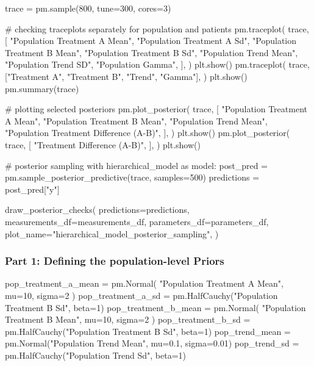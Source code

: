 \documentclass[12pt,a4paper,leqno]{report}
\theoremstyle{plain}
\theoremstyle{definition}
\theoremstyle{remark}
\begin{document}
\begin{pyverbatim}[][fontsize=\footnotesize]
    trace = pm.sample(800, tune=300, cores=3)

    # checking traceplots separately for population and patients
    pm.traceplot(
        trace,
        [
            "Population Treatment A Mean",
            "Population Treatment A Sd",
            "Population Treatment B Mean",
            "Population Treatment B Sd",
            "Population Trend Mean",
            "Population Trend SD",
            "Population Gamma",
        ],
    )
    plt.show()
    pm.traceplot(
        trace, ["Treatment A", "Treatment B", "Trend", "Gamma"],
    )
    plt.show()
    pm.summary(trace)

    # plotting selected posteriors
    pm.plot_posterior(
        trace,
        [
            "Population Treatment A Mean",
            "Population Treatment B Mean",
            "Population Trend Mean",
            "Population Treatment Difference (A-B)",
        ],
    )
    plt.show()
    pm.plot_posterior(
        trace,
        [
            "Treatment Difference (A-B)",
        ],
    )
    plt.show()

# posterior sampling
with hierarchical_model as model:
    post_pred = pm.sample_posterior_predictive(trace, samples=500)
    predictions = post_pred["y"]

draw_posterior_checks(
    predictions=predictions,
    measurements_df=measurements_df,
    parameters_df=parameters_df,
    plot_name="hierarchical_model_posterior_sampling",
)
\end{pyverbatim}
\bigskip


\subsubsection*{Part 1: Defining the population-level Priors}

\bigskip
\begin{pyverbatim}[][fontsize=\footnotesize]
    pop_treatment_a_mean = pm.Normal(
        "Population Treatment A Mean", mu=10, sigma=2
    )
    pop_treatment_a_sd = pm.HalfCauchy("Population Treatment B Sd", beta=1)
    pop_treatment_b_mean = pm.Normal(
        "Population Treatment B Mean", mu=10, sigma=2
    )
    pop_treatment_b_sd = pm.HalfCauchy("Population Treatment B Sd", beta=1)
    pop_trend_mean = pm.Normal("Population Trend Mean", mu=0.1, sigma=0.01)
    pop_trend_sd = pm.HalfCauchy("Population Trend Sd", beta=1)
\end{pyverbatim}
\bigskip
\end{document}

